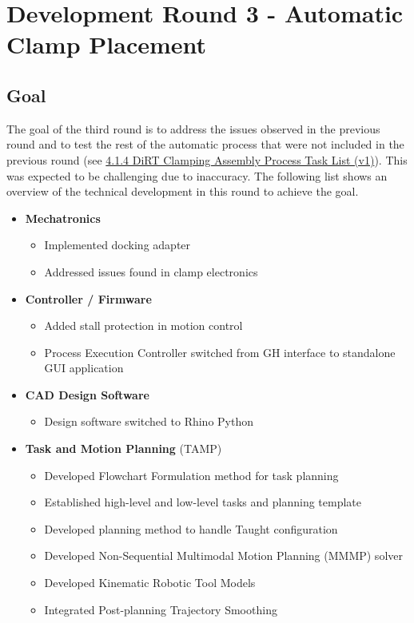 \chapter{Development Round 3 - Automatic Clamp Placement}

\section{Goal}

The goal of the third round is to address the issues observed in the previous round and to test the rest of the automatic process that were not included in the previous round (see \ul{4.1.4 DiRT Clamping Assembly Process Task List (v1)}). This was expected to be challenging due to inaccuracy. The following list shows an overview of the technical development in this round to achieve the goal. 

\begin{itemize}
	\item \textbf{Mechatronics}
    \begin{itemize}
	   \item Implemented docking adapter
	   \item Addressed issues found in clamp electronics
    \end{itemize}
    
	\item \textbf{Controller / Firmware}
    \begin{itemize}
    	\item Added stall protection in motion control
    	\item Process Execution Controller switched from GH interface to standalone GUI application
    \end{itemize}
    
	\item \textbf{CAD Design Software}
    \begin{itemize}
    	\item Design software switched to Rhino Python
    \end{itemize}
    
    \item \textbf{Task and Motion Planning }(TAMP)
    \begin{itemize}
    	\item Developed Flowchart Formulation method for task planning
    	\item Established high-level and low-level tasks and planning template
    	\item Developed planning method to handle Taught configuration
    	\item Developed Non-Sequential Multimodal Motion Planning (MMMP) solver
    	\item Developed Kinematic Robotic Tool Models
    	\item Integrated Post-planning Trajectory Smoothing
    \end{itemize}
    
\end{itemize}

